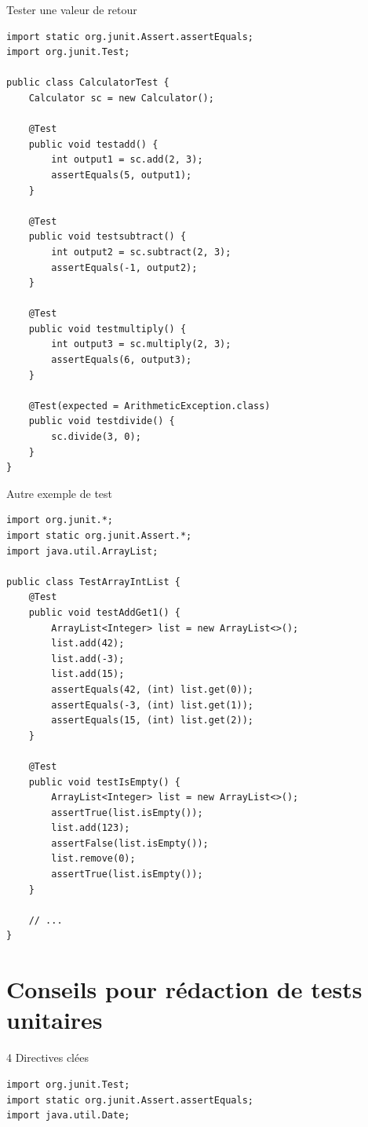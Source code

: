 \documentclass[16pt]{report}
\begin{document}
\begin{multicols*}{2}
        \begin{EExample}{Tester une valeur de retour}{}
\begin{lstlisting}[style=JavaDraculaWhite]
import static org.junit.Assert.assertEquals;
import org.junit.Test;

public class CalculatorTest {
    Calculator sc = new Calculator();

    @Test
    public void testadd() {
        int output1 = sc.add(2, 3);
        assertEquals(5, output1);
    }

    @Test
    public void testsubtract() {
        int output2 = sc.subtract(2, 3);
        assertEquals(-1, output2);
    }

    @Test
    public void testmultiply() {
        int output3 = sc.multiply(2, 3);
        assertEquals(6, output3);
    }

    @Test(expected = ArithmeticException.class)
    public void testdivide() {
        sc.divide(3, 0);
    }
}
\end{lstlisting}           
        \end{EExample}


        \begin{EExample}{Autre exemple de test}{}
\begin{lstlisting}[style=JavaDraculaWhite]
import org.junit.*;
import static org.junit.Assert.*;
import java.util.ArrayList;

public class TestArrayIntList {
    @Test
    public void testAddGet1() {
        ArrayList<Integer> list = new ArrayList<>();
        list.add(42);
        list.add(-3);
        list.add(15);
        assertEquals(42, (int) list.get(0));
        assertEquals(-3, (int) list.get(1));
        assertEquals(15, (int) list.get(2));
    }

    @Test
    public void testIsEmpty() {
        ArrayList<Integer> list = new ArrayList<>();
        assertTrue(list.isEmpty());
        list.add(123);
        assertFalse(list.isEmpty());
        list.remove(0);
        assertTrue(list.isEmpty());
    }

    // ...
}    
\end{lstlisting}            
        \end{EExample}

        \section{Conseils pour rédaction de tests unitaires}


\begin{EExample}{4 Directives clées}{}
\begin{lstlisting}[style=JavaDraculaWhite]
import org.junit.Test;
import static org.junit.Assert.assertEquals;
import java.util.Date;


\end{lstlisting}
\end{EExample}
\end{multicols*}
\end{document}
